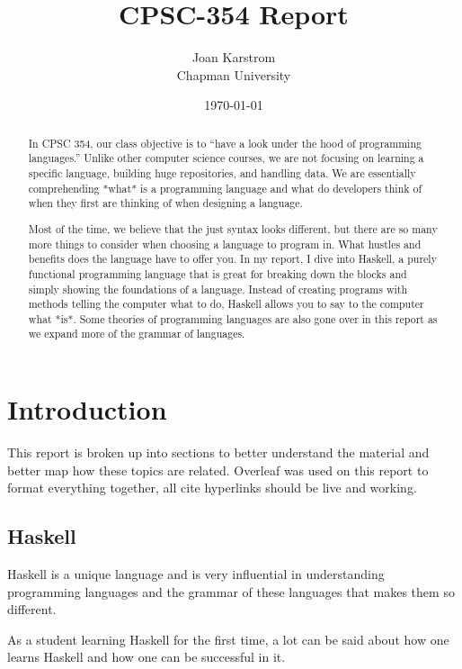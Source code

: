 \documentclass{article}
\title{CPSC-354 Report}
\author{Joan Karstrom  \\ Chapman University}
\date{\today}
\begin{document}
\maketitle

\begin{abstract}
In CPSC 354, our class objective is to “have a look under the hood of programming languages.” Unlike other computer science courses, we are not focusing on learning a specific language, building huge repositories, and handling data. We are essentially comprehending *what* is a programming language and what do developers think of when they first are thinking of when designing a language. 

\medskip\noindent
Most of the time, we believe that the just syntax looks different, but there are so many more things to consider when choosing a language to program in. What hustles and benefits does the language have to offer you. In my report, I dive into Haskell, a purely functional programming language that is great for breaking down the blocks and simply showing the foundations of a language. Instead of creating programs with methods telling the computer what to do, Haskell allows you to say to the computer what *is*. Some theories of programming languages are also gone over in this report as we expand more of the grammar of languages. 
\end{abstract}

\tableofcontents

\section{Introduction}\label{intro}

This report is broken up into sections to better understand the material and better map how these topics are related. Overleaf was used on this report to format everything together, all cite hyperlinks should be live and working. 

\subsection{Haskell}

Haskell is a unique language and is very influential in understanding programming languages and the grammar of these languages that makes them so different. 

\medskip\noindent
As a student learning Haskell for the first time, a lot can be said about how one learns Haskell and how one can be successful in it.
\end{document}
